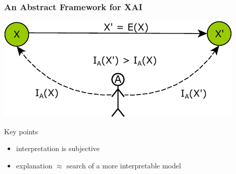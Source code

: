 \documentclass[presentation]{beamer}\mode<presentation>{\usetheme{AMSBolognaFC}}
\begin{document}
\begin{frame}%
    \frametitle{An Abstract Framework for XAI}

    \begin{center}
        \includegraphics[width=.5\linewidth]{figures/framework.pdf}
    \end{center}
    
    \begin{block}{Key points}
        \begin{itemize}
            \item interpretation is \alert{subjective}
            \item explanation $\approx$ search of a \alert{more interpretable} model
        \end{itemize}
    \end{block}
\end{frame}
\end{document}

